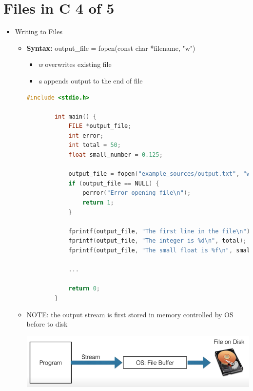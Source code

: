 \documentclass[12pt]{article}
\begin{document}
\section*{Files in C 4 of 5}

\bigskip

\begin{itemize}
    \item Writing to Files
    \begin{itemize}
        \item \textbf{Syntax:} output\_file = fopen(const char *filename, "w")
        \begin{itemize}
            \item \textit{w} overwrites existing file
            \item \textit{a} appends output to the end of file
        \end{itemize}

        \begin{lstlisting}[language=c]
        #include <stdio.h>

        int main() {
            FILE *output_file;
            int error;
            int total = 50;
            float small_number = 0.125;

            output_file = fopen("example_sources/output.txt", "w");
            if (output_file == NULL) {
                perror("Error opening file\n");
                return 1;
            }

            fprintf(output_file, "The first line in the file\n");
            fprintf(output_file, "The integer is %d\n", total);
            fprintf(output_file, "The small float is %f\n", small_number);

            ...

            return 0;
        }
        \end{lstlisting}

        \item NOTE: the output stream is first stored in memory controlled by OS
        before to disk

        \begin{center}
        \includegraphics[width=\linewidth]{images/week_5_notes_part_4_1.png}
        \end{center}


\end{itemize}
\end{itemize}
\end{document}
